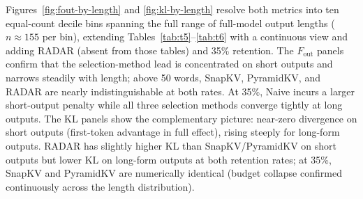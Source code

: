 \documentclass[10pt,letterpaper]{article}
\begin{document}
Figures~\ref{fig:fout-by-length} and \ref{fig:kl-by-length} resolve both
metrics into ten equal-count decile bins spanning the full range of full-model
output lengths ($n \approx 155$ per bin), extending
Tables~\ref{tab:t5}--\ref{tab:t6} with a continuous view and adding RADAR (absent
from those tables) and 35\% retention.  The $F_{\text{out}}$ panels confirm that
the selection-method lead is concentrated on short outputs and narrows steadily
with length; above 50 words, SnapKV, PyramidKV, and RADAR are nearly
indistinguishable at both rates.  At 35\%, Naive incurs a larger short-output
penalty while all three selection methods converge tightly at long outputs.  The
KL panels show the complementary picture: near-zero divergence on short outputs
(first-token advantage in full effect), rising steeply for long-form outputs.
RADAR has slightly higher KL than SnapKV/PyramidKV on short outputs but lower KL
on long-form outputs at both retention rates; at 35\%, SnapKV and PyramidKV are
numerically identical (budget collapse confirmed continuously across the length
distribution).

\end{document}
